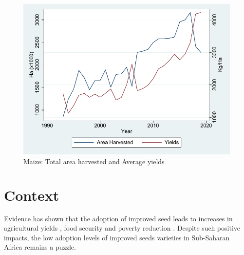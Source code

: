\documentclass{article}
\begin{document}
\begin{figure}[H]
    \centering
    \includegraphics{results/figures/Maize_yields.pdf}
    \caption{Maize: Total area harvested and Average yields}
    \label{fig:maize_yields}
\end{figure}


\section{Context}

Evidence has shown that the adoption of improved seed leads to increases in agricultural yields \citep{Carter2014-fm}, food security \citep{Shiferaw2014-op} and poverty reduction \citep{Minten2008-tj}. Despite such positive impacts, the low adoption levels of improved seeds varieties in Sub-Saharan Africa remains a puzzle. 
\end{document}

